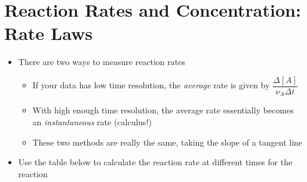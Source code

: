 \documentclass[12pt, openany, letterpaper]{memoir}
\begin{document}
\section{Reaction Rates and Concentration: Rate Laws}
\begin{itemize}
	\item There are two ways to measure reaction rates
	\begin{itemize}
		\item If your data has low time resolution, the \emph{average} rate is given by $\dfrac{\Delta\left[A\right]}{\nu_A\Delta t}$
		\item With high enough time resolution, the average rate essentially becomes an \emph{instantaneous} rate (calculus!)
		\item These two methods are really the same, taking the slope of a tangent line
	\end{itemize}
	\item Use the table below to calculate the reaction rate at different times for the reaction 
	

\end{itemize}
\end{document}
